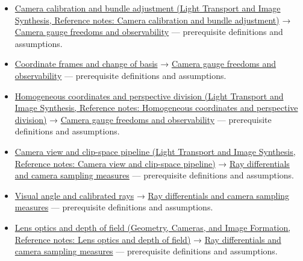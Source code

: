 \begin{itemize}
\tightlist
\item
  \href{../04-Light-Transport-and-Image-Synthesis/main.pdf\#nameddest=appendix-3ee9861904d5}{Camera calibration and bundle adjustment (Light Transport and Image Synthesis, Reference notes: Camera calibration and bundle adjustment)} → \hyperref[appendix-113f0267e5f4]{Camera gauge freedoms and observability} --- prerequisite definitions and assumptions.
\item
  \hyperref[appendix-1bae9457dbc3]{Coordinate frames and change of basis} → \hyperref[appendix-113f0267e5f4]{Camera gauge freedoms and observability} --- prerequisite definitions and assumptions.
\item
  \href{../04-Light-Transport-and-Image-Synthesis/main.pdf\#nameddest=appendix-cb3b26862282}{Homogeneous coordinates and perspective division (Light Transport and Image Synthesis, Reference notes: Homogeneous coordinates and perspective division)} → \hyperref[appendix-113f0267e5f4]{Camera gauge freedoms and observability} --- prerequisite definitions and assumptions.
\item
  \href{../04-Light-Transport-and-Image-Synthesis/main.pdf\#nameddest=appendix-1c07d64f5e70}{Camera view and clip-space pipeline (Light Transport and Image Synthesis, Reference notes: Camera view and clip-space pipeline)} → \hyperref[appendix-8c40fad29462]{Ray differentials and camera sampling measures} --- prerequisite definitions and assumptions.
\item
  \hyperref[appendix-7d356c396d1a]{Visual angle and calibrated rays} → \hyperref[appendix-8c40fad29462]{Ray differentials and camera sampling measures} --- prerequisite definitions and assumptions.
\item
  \href{../03-Geometry-Cameras-and-Image-Formation/main.pdf\#nameddest=appendix-21f8456e2629}{Lens optics and depth of field (Geometry, Cameras, and Image Formation, Reference notes: Lens optics and depth of field)} → \hyperref[appendix-8c40fad29462]{Ray differentials and camera sampling measures} --- prerequisite definitions and assumptions.
\end{itemize}
